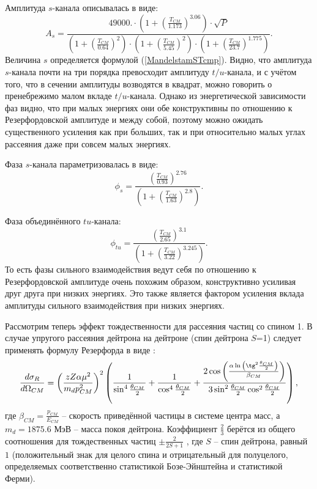 \documentclass[a4paper,12pt]{article}
\begin{document}
\begin{large}
  Амплитуда $s$-канала описывалась в виде:
\begin{equation}
  \label{AmplitudeStu}
A_s =  \frac{49000. \cdot \left( 1 + \left(\frac{T_{CM}}{1.173} \right)^{3.06} \right) \cdot \sqrt{P}}{ \left( 1 + \left( \frac{T_{CM}}{0.64}\right)^2 \right) \cdot \left( 1 + \left(\frac{T_{CM}}{5.45} \right)^2 \right) \cdot \left( 1 + \left(\frac{T_{CM}}{23.7}\right)^{1.775} \right)}.
\end{equation}
  Величина $s$ определяется формулой (\ref{MandelstamSTcmp}).
  Видно, что амплитуда $s$-канала почти на три порядка превосходит амплитуду $t/u$-канала, и с учётом того, что в сечении амплитуды возводятся в квадрат, можно говорить о пренебрежимо малом вкладе $t/u$-канала.
  Однако из энергетической зависимости фаз видно, что при малых энергиях они обе конструктивны по отношению к Резерфордовской амплитуде и между собой, поэтому можно ожидать существенного усиления как при больших, так и при относительно малых углах рассеяния даже при совсем малых энергиях.

Фаза $s$-канала параметризовалась в виде:
\begin{equation}
  \label{Phases}
\phi_{s}=\frac{\left(\frac{T_{CM}}{0.93}\right)^{2.76}}{ \left( 1 + \left( \frac{T_{CM}}{1.63}\right)^{2.8}\right)}.
\end{equation}

Фаза объединённого $tu$-канала:
\begin{equation}
  \label{Phasetu}
\phi_{tu}=\frac{\left(\frac{T_{CM}}{2.65}\right)^{3.1}}{ \left( 1 + \left(\frac{T_{CM}}{3.22}\right)^{3.245}\right)}.
\end{equation}
  То есть фазы сильного взаимодействия ведут себя по отношению к Резерфордовской амплитуде очень похожим образом, конструктивно усиливая друг друга при низких энергиях.
  Это также является фактором усиления вклада амплитуды сильного взаимодействия при низких энергиях.
  
  Рассмотрим теперь эффект тождественности для рассеяния частиц со спином 1.
  В случае упругого рассеяния дейтрона на дейтроне (спин дейтрона $S$=1) следует применять формулу Резерфорда в виде \cite{LandauLifshitzNonrelativisticQM}:
\begin{equation}
  \label{dSigmadOmegaCMFull}
  \frac{d\sigma_{R}}{d\Omega_{CM}}=\left( \frac{zZ\alpha\mu^2}{m_d p_{CM}^2} \right)^2\left( \frac{1}{\sin^4{\frac{\theta_{CM}}{2}}} +  \frac{1}{\cos^4{\frac{\theta_{CM}}{2}}} + \frac{2\cos{ \left( \frac{\alpha\ln{ \left( \tg^2{\frac{\theta_{CM}}{2}} \right) }}{\beta_{CM}} \right) }}{3\sin^2{\frac{\theta_{CM}}{2}}\cos^2{\frac{\theta_{CM}}{2}}}\right),
\end{equation}
где $\beta_{CM}=\frac{p_{CM}}{E_{CM}}$ -- скорость приведённой частицы в системе центра масс, а $m_d=1875.6$ МэВ -- масса покоя дейтрона. Коэффициент $\frac{2}{3}$ берётся из общего соотношения для тождественных частиц $\pm \frac{2}{2S+1}$ \cite{LandauLifshitzNonrelativisticQM}, где $S$ -- спин дейтрона, равный $1$ (положительный знак для целого спина и отрицательный для полуцелого, определяемых соответственно статистикой Бозе-Эйнштейна и статистикой Ферми).


\end{large}
\end{document}
